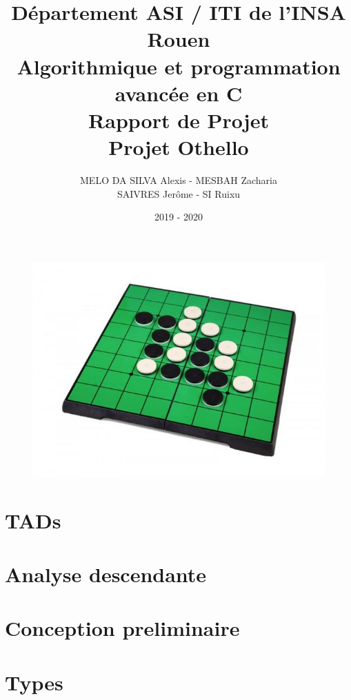 \documentclass[french]{extarticle}
\begin{document}
\title{Département ASI / ITI de l'INSA Rouen \\
	Algorithmique et programmation avancée en C\\
	Rapport de Projet\\
	Projet Othello}
\author{MELO DA SILVA Alexis - MESBAH Zacharia\\
SAIVRES Jerôme - SI Ruixu}
\date{2019 - 2020}
\maketitle
\begin{figure}[h]
	\centering
	\includegraphics[width=12cm]{./sourcesIMAGES/othello.jpg}
  \end{figure}

\newpage
\tableofcontents

\newpage
\section{TADs}
	

\newpage
\section{Analyse descendante}
	

\newpage
\section{Conception preliminaire}
	
	
	

\newpage
\section{Types}
	
\end{document}
